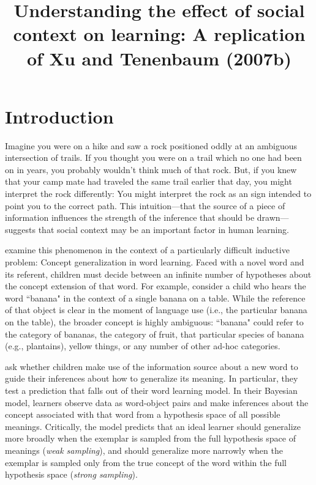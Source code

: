 \documentclass[man]{apa2}
\title{Understanding the effect of social context on learning: A replication of Xu and Tenenbaum (2007b)}
\begin{document}
\maketitle              


\section{Introduction}
Imagine you were on a hike and saw a rock positioned oddly at an ambiguous intersection of trails.  If you thought you were on a trail  which no one had been on in years, you probably wouldn't think much of that rock. But, if you knew that your camp mate had traveled the same trail earlier that day, you might interpret the rock differently: You might interpret the rock as an sign intended to point you to the correct path. This intuition---that the  source of a piece of information influences the strength of the inference that should be drawn---suggests that social context may be an important factor in human learning.

 examine this phenomenon in the context of a particularly difficult inductive problem: Concept generalization in word learning. Faced with a novel word and its referent, children must decide between an infinite number of hypotheses about the concept extension of that word. For example, consider a child who hears the word  ``banana" in the context of a single banana on a table. While the reference of that object is clear in the moment of language use (i.e., the particular banana on the table), the broader concept is highly ambiguous: ``banana" could refer to the category of bananas, the category of fruit, that particular species of banana (e.g., plantains), yellow things, or any number of other ad-hoc categories. 

 ask whether children make use of the information source about a new word to guide their inferences about how to generalize its meaning. In particular, they test a prediction that falls out of their word learning model. In their Bayesian model, learners observe data as word-object pairs and make inferences about the concept associated with that word from a hypothesis space of all possible meanings. Critically, the model predicts that  an ideal  learner should generalize more broadly when the exemplar is sampled from the full hypothesis space of meanings ({\it weak sampling}), and should generalize more narrowly when the exemplar is sampled only from the true concept of the word within the full hypothesis space ({\it strong sampling}). 
\end{document}
